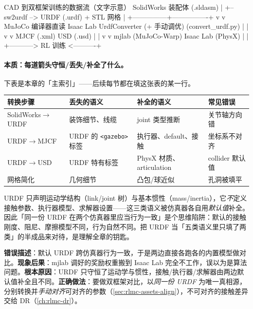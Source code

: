 \begin{codebox}{CAD 到双框架训练的数据流（文字示意）}
SolidWorks 装配体 (.sldasm)
    |
    +-- sw2urdf --> URDF (.urdf) + STL 网格
                        |
        +---------------+----------------+
        v                                v
   MuJoCo 编译器直读                 Isaac Lab UrdfConverter
   (+ 手动调优)                      (convert_urdf.py)
        |                                |
        v                                v
   MJCF (.xml)                      USD (.usd)
        |                                |
        v                                v
   mjlab (MuJoCo-Warp)             Isaac Lab (PhysX)
        |                                |
        +-----------> RL 训练 <----------+
\end{codebox}

\paragraph{本质：每道箭头守恒/丢失/补全了什么。}下表是本章的「主索引」——后续每节都在填这张表的某一行。

\begin{center}
\small
\begin{tabular}{@{}llll@{}}
\toprule
转换步骤 & 丢失的语义 & 补全的语义 & 常见错误 \\
\midrule
SolidWorks$\to$URDF & 装饰细节、线缆 & joint 类型推断 & 关节轴方向错 \\
URDF$\to$MJCF & URDF 的 \texttt{<gazebo>} 标签 & 执行器、default、接触 & 坐标系不对齐 \\
URDF$\to$USD & URDF 特有标签 & PhysX 材质、articulation & collider 默认值 \\
网格简化 & 几何细节 & 凸包/球近似 & 孔洞被填平 \\
\bottomrule
\end{tabular}
\end{center}

\begin{insight}\label{ins:rlmc-assets-skeleton}
URDF 只声明运动学结构（link/joint 树）与基本惯性（mass/inertia），它\emph{不}定义接触参数、执行器模型、求解器设置——这三类语义被仿真器各自用\emph{默认值}补全。因此「同一份 URDF 在两个仿真器里应当行为一致」是个思维陷阱：默认的接触刚度、阻尼、摩擦模型不同，行为自然不同。把 URDF 当「五类语义里只填了两类」的半成品来对待，是理解全章的钥匙。
\end{insight}

\begin{pitfall}
\textbf{错误描述}：默认 URDF 跨仿真器行为一致，于是两边直接各跑各的内置模型做对比。\textbf{现象后果}：mjlab 调好的奖励权重搬到 Isaac Lab 完全不工作，误以为是算法问题。\textbf{根本原因}：URDF 只守恒了运动学与惯性，接触/执行器/求解器由两边默认值补全且不同。\textbf{正确做法}：要做双框架对比，以\emph{同一份 URDF} 为唯一真相源，分别转换并\emph{手动对齐}可对齐的参数（\cref{sec:rlmc-assets-align}），不可对齐的接触差异交给 DR（\cref{ch:rlmc-dr}）。
\end{pitfall}

